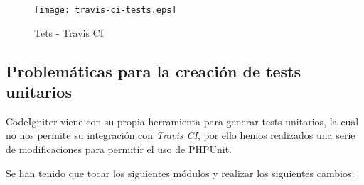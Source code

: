 \begin{figure}[H]
    \centering
    \texttt{[image: travis-ci-tests.eps]}
    \caption{Tets - Travis CI}\label{fig:travis-ci-tests}
\end{figure}

\subsection{Problemáticas para la creación de tests unitarios}

CodeIgniter viene con su propia herramienta para generar tests unitarios, la cual no nos permite su integración con \emph{Travis CI}, por ello hemos realizados una serie de modificaciones para permitir el uso de PHPUnit.

Se han tenido que tocar los siguientes módulos y realizar los siguientes cambios:

